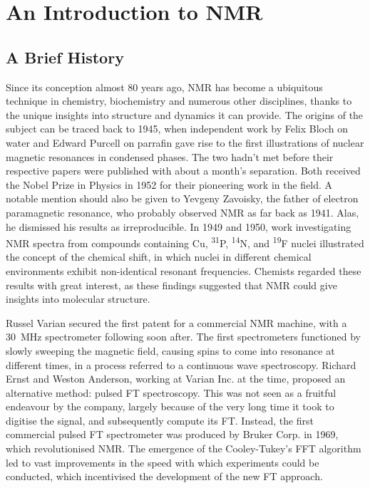 \section{An Introduction to \acs{NMR}}

\subsection{A Brief History}
Since its conception almost 80 years ago, \ac{NMR} has become a ubiquitous
technique in chemistry, biochemistry and numerous other disciplines, thanks to
the unique insights into structure and dynamics it can provide.
The origins of the subject can be traced back to 1945, when independent work by
Felix Bloch on water\cite{Bloch1946} and Edward Purcell on
parrafin\cite{Purcell1946} gave rise to the first illustrations of nuclear
magnetic resonances in condensed phases. The two hadn't met before their
respective papers were published with about a month's
separation\cite{Becker1993}. Both received the Nobel Prize in Physics in 1952
for their pioneering work in the field. A notable mention should also be given
to Yevgeny Zavoisky, the father of electron paramagnetic resonance, who
probably observed NMR as far back as 1941\cite{Eaton1998}. Alas, he dismissed
his results as irreproducible. In 1949 and 1950, work investigating \ac{NMR}
spectra from compounds containing Cu, \textsuperscript{31}P,
\textsuperscript{14}N, and \textsuperscript{19}F nuclei illustrated the concept
of the chemical shift\cite{Knight1949, Proctor1950, Dickinson1950}, in which
nuclei in different chemical environments exhibit non-identical resonant
frequencies.  Chemists regarded these results with great interest, as these
findings suggested that \ac{NMR} could give insights into molecular structure.

Russel Varian secured the first patent for a commercial \ac{NMR} machine, with
a \qty{30}{\mega\hertz} spectrometer following soon after. The first
spectrometers functioned by slowly sweeping the magnetic field,
causing spins to come into resonance at different times, in a process referred
to a continuous wave spectroscopy. Richard Ernst and
Weston Anderson, working at Varian Inc. at the time, proposed an alternative
method: pulsed \ac{FT} spectroscopy\cite{Ernst1966}. This was not seen as a
fruitful endeavour by the company, largely because of the very long time it
took to digitise the signal, and subsequently compute its FT\cite{Freeman2015}.
Instead, the first commercial pulsed \ac{FT} spectrometer was produced by
Bruker Corp. in 1969, which revolutionised NMR. The emergence of the
Cooley-Tukey's \ac{FFT} algorithm\cite{Cooley1965} led to vast improvements in
the speed with which experiments could be conducted, which incentivised the
development of the new \ac{FT} approach.


